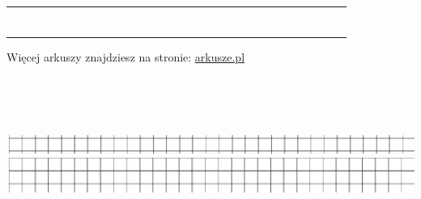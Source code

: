 \documentclass[10pt]{article}
\begin{document}
\begin{center}
\begin{tabular}{|c|c|c|c|c|c|c|c|c|c|c|c|c|c|c|c|c|c|c|c|c|c|c|c|c|c|c|c|c|c|}
\hline
 &  &  &  &  &  &  &  &  &  &  &  &  &  &  &  &  &  &  &  &  &  &  &  &  &  &  &  &  &  \\
\hline
 &  &  &  &  &  &  &  &  &  &  &  &  &  &  &  &  &  &  &  &  &  &  &  &  &  &  &  &  &  \\
\hline
 &  &  &  &  &  &  &  &  &  &  &  &  &  &  &  &  &  &  &  &  &  &  &  &  &  &  &  &  &  \\
\hline
 &  &  &  &  &  &  &  &  &  &  &  &  &  &  &  &  &  &  &  &  &  &  &  &  &  &  &  &  &  \\
\hline
 &  &  &  &  &  &  &  &  &  &  &  &  &  &  &  &  &  &  &  &  &  &  &  &  &  &  &  &  &  \\
\hline
 &  &  &  &  &  &  &  &  &  &  &  &  &  &  &  &  &  &  &  &  &  &  &  &  &  &  &  &  &  \\
\hline
 &  &  &  &  &  &  &  &  &  &  &  &  &  &  &  &  &  &  &  &  &  &  &  &  &  &  &  &  &  \\
\hline
 &  &  &  &  &  &  &  &  &  &  &  &  &  &  &  &  &  &  &  &  &  &  &  &  &  &  &  &  &  \\
\hline
\end{tabular}
\end{center}

Więcej arkuszy znajdziesz na stronie: \href{http://arkusze.pl}{arkusze.pl}\\
\(\qquad\)

\begin{center}
\begin{tabular}{|l|l|l|l|l|l|l|l|l|l|l|l|l|l|l|l|l|l|l|l|l|l|}
 \\
\hline
\end{tabular}
\end{center}

\(\qquad\)\\
\(\qquad\)\\
\includegraphics[max width=\textwidth, center]{2024_11_21_f29375993e8c629c464fg-06(1)}\\
\includegraphics[max width=\textwidth, center]{2024_11_21_f29375993e8c629c464fg-06}
\end{document}
